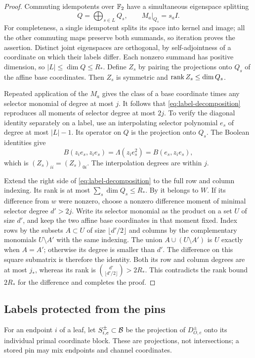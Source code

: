 \begin{proof}
Commuting idempotents over $\mathbb F_2$ have a simultaneous eigenspace
splitting
\[
 Q=\bigoplus_{s\in L}Q_s,
 \qquad M_a|_{Q_s}=s_a I.
\]
For completeness, a single idempotent splits its space into kernel
and image; all the other commuting maps preserve both summands,
so iteration proves the assertion.  Distinct joint eigenspaces
are orthogonal, by self-adjointness of a coordinate on which their
labels differ.  Each nonzero summand has positive dimension, so
$|L|\le\dim Q\le R_*$.  Define $Z_s$ by pairing the projections
onto $Q_s$ of the affine base coordinates.  Then $Z_s$ is symmetric
and $\operatorname{rank} Z_s\le\dim Q_s$.

Repeated application of the $M_a$ gives the class of a base
coordinate times any selector monomial of degree at most $j$.
It follows that \eqref{eq:label-decomposition} reproduces all
moments of selector degree at most $2j$.  To verify the diagonal
identity separately on a label, use an interpolating selector
polynomial $e_s$ of degree at most $|L|-1$.  Its operator on $Q$
is the projection onto $Q_s$.  The Boolean identities give
\[
 B(z_i e_s,z_i e_s)
 =\Lambda(z_i e_s^2)
 =B(e_s,z_i e_s),
\]
which is $(Z_s)_{ii}=(Z_s)_{0i}$.  The interpolation degrees are
within $j$.

Extend the right side of \eqref{eq:label-decomposition} to the
full row and column indexing.  Its rank is at most
$\sum_s\dim Q_s\le R_*$.  By  it belongs
to $W$.  If its difference from $w$ were nonzero, choose a
nonzero difference moment of minimal selector degree $d'>2j$.
Write its selector monomial as the product on a set $U$ of size
$d'$, and keep the two affine base coordinates in that moment
fixed.  Index rows by the subsets $A\subset U$ of size
$\lfloor d'/2\rfloor$ and columns by the complementary monomials
$U\setminus A'$ with the same indexing.  The union
$A\cup(U\setminus A')$ is $U$ exactly when $A=A'$; otherwise
its degree is smaller than $d'$.  The difference on this square
submatrix is therefore the identity.  Both its row and column
degrees are at most $j_*$, whereas its rank is
$\binom{d'}{\lfloor d'/2\rfloor}>2R_*$.  This contradicts the
rank bound $2R_*$ for the difference and completes the proof.
\end{proof}

\subsection{Labels protected from the pins}

For an endpoint $i$ of a leaf, let $S_{i,e}^{\pm}\subset\mathcal B$
be the projection of $D_{O,e}^{\pm}$ onto its individual primal
coordinate block.  These are projections, not intersections;
a stored pin may mix endpoints and channel coordinates.

